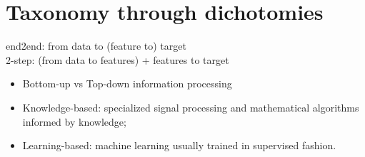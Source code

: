 \section{Taxonomy through dichotomies}
end2end: from data to (feature to) target
\\2-step: (from data to features) + features to target

\begin{itemize}
    \item Bottom-up vs Top-down information processing
    \item Knowledge-based: specialized signal processing and mathematical algorithms informed by knowledge;
    \item Learning-based: machine learning usually trained in supervised fashion.
\end{itemize}

